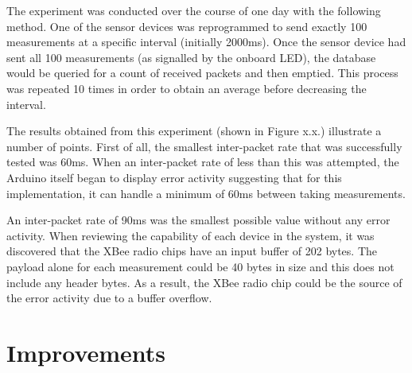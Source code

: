     The experiment was conducted over the course of one day with the following method. One of the sensor devices was reprogrammed to send exactly 100 measurements at a specific interval (initially 2000ms). Once the sensor device had sent all 100 measurements (as signalled by the onboard LED), the database would be queried for a count of received packets and then emptied. This process was repeated 10 times in order to obtain an average before decreasing the interval.

    The results obtained from this experiment (shown in Figure x.x.) illustrate a number of points. First of all, the smallest inter-packet rate that was successfully tested was 60ms. When an inter-packet rate of less than this was attempted, the Arduino itself began to display error activity suggesting that for this implementation, it can handle a minimum of 60ms between taking measurements.

    An inter-packet rate of 90ms was the smallest possible value without any error activity. When reviewing the capability of each device in the system, it was discovered that the XBee radio chips have an input buffer of 202 bytes. The payload alone for each measurement could be 40 bytes in size and this does not include any header bytes. As a result, the XBee radio chip could be the source of the error activity due to a buffer overflow.

  \section{Improvements}
